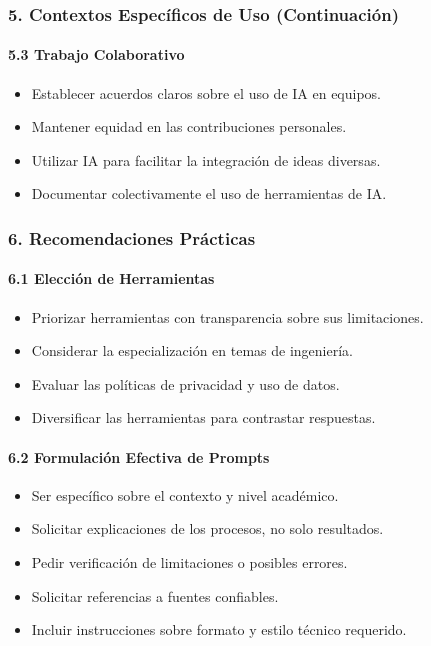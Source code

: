 \documentclass{beamer}
\begin{document}
	\begin{frame}
		\frametitle{5. Contextos Específicos de Uso (Continuación)}
		\framesubtitle{5.3 Trabajo Colaborativo}
		\begin{itemize}
			\item Establecer acuerdos claros sobre el uso de IA en equipos.
			\item Mantener equidad en las contribuciones personales.
			\item Utilizar IA para facilitar la integración de ideas diversas.
			\item Documentar colectivamente el uso de herramientas de IA.
		\end{itemize}
	\end{frame}
	
	\begin{frame}
		\frametitle{6. Recomendaciones Prácticas}
		\framesubtitle{6.1 Elección de Herramientas}
		\begin{itemize}
			\item Priorizar herramientas con transparencia sobre sus limitaciones.
			\item Considerar la especialización en temas de ingeniería.
			\item Evaluar las políticas de privacidad y uso de datos.
			\item Diversificar las herramientas para contrastar respuestas.
		\end{itemize}
		\pause
		\framesubtitle{6.2 Formulación Efectiva de Prompts}
		\begin{itemize}
			\item Ser específico sobre el contexto y nivel académico.
			\item Solicitar explicaciones de los procesos, no solo resultados.
			\item Pedir verificación de limitaciones o posibles errores.
			\item Solicitar referencias a fuentes confiables.
			\item Incluir instrucciones sobre formato y estilo técnico requerido.
		\end{itemize}
	\end{frame}
	
\end{document}
